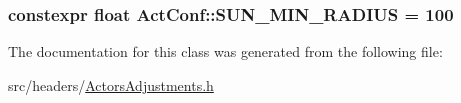 \hypertarget{class_act_conf_aaca11dfebfee923c701bd24349cf4804}{
\subsubsection[{S\+U\+N\+\_\+\+M\+I\+N\+\_\+\+R\+A\+D\+I\+U\+S}]{\setlength{\rightskip}{0pt plus 5cm}constexpr float Act\+Conf\+::\+S\+U\+N\+\_\+\+M\+I\+N\+\_\+\+R\+A\+D\+I\+U\+S = 100\hspace{0.3cm}{\ttfamily [static]}}}\label{class_act_conf_aaca11dfebfee923c701bd24349cf4804}


The documentation for this class was generated from the following file\+:\begin{DoxyCompactItemize}
\item 
src/headers/\hyperlink{_actors_adjustments_8h}{Actors\+Adjustments.\+h}\end{DoxyCompactItemize}
